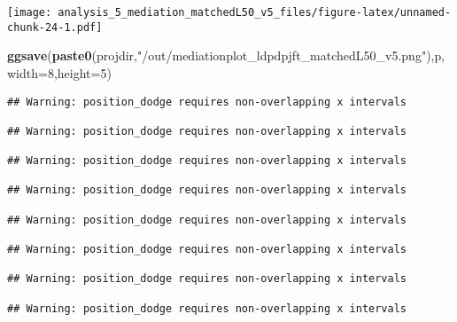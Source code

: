 \documentclass[
]{article}
\newenvironment{Shaded}{\begin{snugshade}}{\end{snugshade}}
\newcommand{\DataTypeTok}[1]{\textcolor[rgb]{0.13,0.29,0.53}{#1}}
\newcommand{\DecValTok}[1]{\textcolor[rgb]{0.00,0.00,0.81}{#1}}
\newcommand{\KeywordTok}[1]{\textcolor[rgb]{0.13,0.29,0.53}{\textbf{#1}}}
\newcommand{\NormalTok}[1]{#1}
\newcommand{\StringTok}[1]{\textcolor[rgb]{0.31,0.60,0.02}{#1}}
\begin{document}
\texttt{[image: analysis\_5\_mediation\_matchedL50\_v5\_files/figure-latex/unnamed-chunk-24-1.pdf]}

\begin{Shaded}
\begin{Highlighting}[]
\KeywordTok{ggsave}\NormalTok{(}\KeywordTok{paste0}\NormalTok{(projdir,}\StringTok{"/out/mediationplot_ldpdpjft_matchedL50_v5.png"}\NormalTok{),p,}\DataTypeTok{width=}\DecValTok{8}\NormalTok{,}\DataTypeTok{height=}\DecValTok{5}\NormalTok{)}
\end{Highlighting}
\end{Shaded}

\begin{verbatim}
## Warning: position_dodge requires non-overlapping x intervals

## Warning: position_dodge requires non-overlapping x intervals

## Warning: position_dodge requires non-overlapping x intervals

## Warning: position_dodge requires non-overlapping x intervals

## Warning: position_dodge requires non-overlapping x intervals

## Warning: position_dodge requires non-overlapping x intervals

## Warning: position_dodge requires non-overlapping x intervals

## Warning: position_dodge requires non-overlapping x intervals
\end{verbatim}
\end{document}
